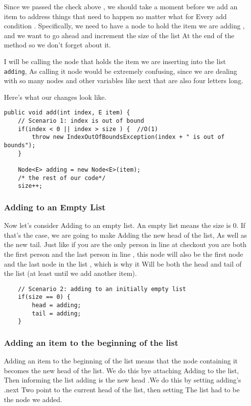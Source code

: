 Since we passed the check above , we should take a moment before we add an item to address things that need to happen no matter what for Every add condition . Specifically, we need to have a node to hold the item we are adding , and we want to go ahead and increment the size of the list At the end of the method so we don't forget about it.

I will be calling the node that holds the item we are inserting into the list \texttt{adding}, As calling it node would be extremely confusing, since we are dealing with so many nodes and other variables like next that are also four letters long.

Here's what our changes look like.

\begin{verbatim}
public void add(int index, E item) {
	// Scenario 1: index is out of bound
	if(index < 0 || index > size ) {  //O(1)
		throw new IndexOutOfBoundsException(index + " is out of bounds");
	}
	
	Node<E> adding = new Node<E>(item);
	/* the rest of our code*/
	size++;
\end{verbatim}



\subsubsection{Adding to an Empty List}
Now let's consider Adding to an empty list.  An empty list means the size is 0.  If that's the case, we are going to make Adding the new head of the list, As well as the new tail.  Just like if you are the only person in line at checkout you are both the first person and the last person in line , this node will also be the first node and the last node in the list , which is why it Will be both the head and tail of the list (at least until we add another item).

\begin{verbatim}
	// Scenario 2: adding to an initially empty list
	if(size == 0) {
		head = adding;
		tail = adding;
	}	
\end{verbatim}



\subsubsection{Adding an item to the beginning of the list}
Adding an item to the beginning of the list means that the node containing it becomes the new head of the list.  We do this bye attaching Adding to the list, Then informing the list adding is the new head .We do this by setting adding's .next Two point to the current head of the list, then setting The list had to be the node we added.

